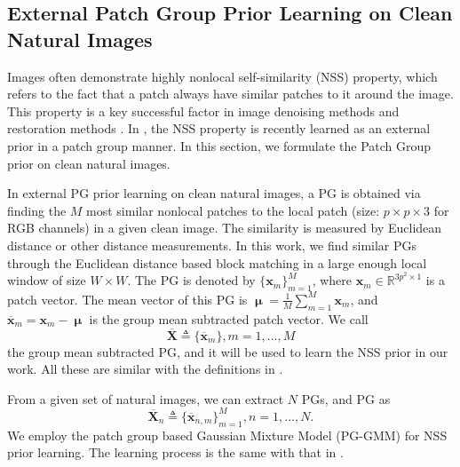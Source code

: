 \documentclass[10pt,twocolumn,letterpaper]{article}
\begin{document}
\subsection{External Patch Group Prior Learning on Clean Natural Images}
Images often demonstrate highly nonlocal self-similarity (NSS) property, which refers to the fact that a patch always have similar patches to it around the image. This property is a key successful factor in image denoising methods \cite{nlm,bm3d,lssc,ncsr,wnnm} and restoration methods \cite{}. In \cite{pgpd}, the NSS property is recently learned as an external prior in a patch group manner. In this section, we formulate the Patch Group prior on clean natural images.

In external PG prior learning on clean natural images, a PG is obtained via finding the $M$ most similar nonlocal patches to the local patch (size: $p\times p \times 3$ for RGB channels) in a given clean image. The similarity is measured by Euclidean distance or other distance measurements. In this work, we find similar PGs through the Euclidean distance based block matching in a large enough local window of size $W\times W$. The PG is denoted by $\{\mathbf{x}_{m}\}_{m=1}^{M}$, where $\mathbf{x}_{m}\in \mathbb{R}^{3p^{2}\times1}$ is a patch vector. The mean vector of this PG is $\boldsymbol{\upmu}=\frac{1}{M}\sum_{m=1}^{M}\mathbf{x}_{m}$, and $\mathbf{\overline{x}}_{m}=\mathbf{x}_{m}-\boldsymbol{\upmu}$ is the group mean subtracted patch vector. We call
\begin{equation}\label{equ1}
\mathbf{\overline{X}}\triangleq \{\mathbf{\overline{x}}_{m}\}, m=1,...,M
\end{equation}
the group mean subtracted PG, and it will be used to learn the NSS prior in our work. All these are similar with the definitions in \cite{pgpd}. 

From a given set of natural images, we can extract $N$ PGs, and  PG as
\begin{equation}\label{equ2}
\mathbf{\overline{X}}_{n}\triangleq \{\mathbf{\overline{x}}_{n,m}\}_{m=1}^{M}, n=1,...,N.
\end{equation}
We employ the patch group based Gaussian Mixture Model (PG-GMM) for NSS prior learning. The learning process is the same with that in \cite{pgpd}.
\end{document}
